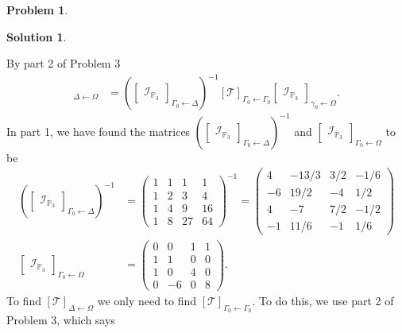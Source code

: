 \documentclass{article}
\theoremstyle{definition}
\newtheorem*{prob*}{Problem}
\newtheorem*{sln*}{Solution}
\newcommand{\T}{\mathcal{T}}
\begin{document}
\begin{prob*}
\begin{sln*}
\begin{enumerate}
\begin{enumerate}
				By part 2 of Problem 3
				\begin{align*}
				[\mathcal{T}]_{\Delta \leftarrow \Omega} &= 
				\left(\begin{bmatrix}
				\mathcal{I}_{\mathbb{P}_3}
				\end{bmatrix}_{\Gamma_0 \leftarrow \Delta}\right)^{-1} [\mathcal{T}]_{\Gamma_0 \leftarrow \Gamma_0} 
				\begin{bmatrix}
				\mathcal{I}_{\mathbb{P}_3}
				\end{bmatrix}_{\gamma_0 \leftarrow \Omega}.
				\end{align*}
				In part 1, we have found the matrices $\left(\begin{bmatrix}
				\mathcal{I}_{\mathbb{P}_3}
				\end{bmatrix}_{\Gamma_0 \leftarrow \Delta}\right)^{-1}$ and $\begin{bmatrix}
				\mathcal{I}_{\mathbb{P}_3}
				\end{bmatrix}_{\Gamma_0 \leftarrow \Omega}$ to be
				\begin{align*}
				\left(\begin{bmatrix}
				\mathcal{I}_{\mathbb{P}_3}
				\end{bmatrix}_{\Gamma_0 \leftarrow \Delta}\right)^{-1} &= \begin{pmatrix}
				1&1&1&1\\
				1&2&3&4\\
				1&4&9&16\\
				1&8&27&64
				\end{pmatrix}^{-1} = 
				\begin{pmatrix}
				4&-13/3&3/2&-1/6\\
				-6&19/2&-4&1/2\\
				4&-7&7/2&-1/2\\
				-1&11/6&-1&1/6
				\end{pmatrix}\\
				\begin{bmatrix}
				\mathcal{I}_{\mathbb{P}_3}
				\end{bmatrix}_{\Gamma_0 \leftarrow \Omega}
				&= \begin{pmatrix}
				0&0&1&1\\
				1&1&0&0\\
				1&0&4&0\\
				0&-6&0&8
				\end{pmatrix}.
				\end{align*}
				To find $[\T]_{\Delta\leftarrow\Omega}$ we only need to find $[\T]_{\Gamma_0\leftarrow\Gamma_0}$. To do this, we use part 2 of Problem 3, which says

\end{enumerate}
\end{enumerate}
\end{sln*}
\end{prob*}
\end{document}
